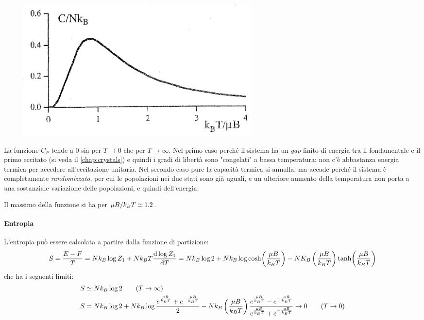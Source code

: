 \begin{figure}[t]
	\centering
	\includegraphics[width=0.6\textwidth]{Immagini/IsingCl.png}
	\vspace{-10pt}
	\caption{}
	\label{fig:isingcp}
	\vspace{-10pt}
\end{figure}

La funzione $ C_P $ tende a $ 0 $ sia per $ T \rightarrow 0 $ che per $ T \rightarrow \infty $. Nel primo caso perché il sistema ha un \textit{gap} finito di energia tra il fondamentale e il primo eccitato (si veda il \cref{chap:crystals}) e quindi i gradi di libertà sono "congelati" a bassa temperatura: non c'è abbastanza energia termica per accedere all'eccitazione unitaria. Nel secondo caso pure la capacità termica si annulla, ma accade perché il sistema è completamente \textit{randomizzato}, per cui le popolazioni nei due stati sono già uguali, e un ulteriore aumento della temperatura non porta a una sostanziale variazione delle popolazioni, e quindi dell'energia.

Il massimo della funzione si ha per $ \mu B / k_B T \simeq 1.2 $.

\paragraph{Entropia} L'entropia può essere calcolata a partire dalla funzione di partizione:
\begin{equation*}
S = \frac{E - F}{T} = N k_B \log Z_1 + N \kt \derivative{\log Z_1}{T} = N k_B \log 2 + N k_B \log \cosh(\frac{\mu B}{\kt}) - N K_B \left(\frac{\mu B}{\kt}\right) \tanh(\frac{\mu B}{\kt})
\end{equation*}
che ha i seguenti limiti:
\begin{align*}
S &\simeq N k_B \log 2 \qquad (T\rightarrow \infty)\\
S &= N k_B \log 2 + N k_B \log \frac{e^{\frac{\mu B}{k_B T}} + e^{-\frac{\mu B}{k_B T}}}{2} - N k_B \left(\frac{\mu B}{k_B T}\right) \frac{e^{\frac{\mu B}{k_B T}} - e^{-\frac{\mu B}{k_B T}}}{e^{\frac{\mu B}{k_B T}} + e^{-\frac{\mu B}{k_B T}}} \rightarrow 0  \qquad (T \rightarrow 0)
\end{align*}

